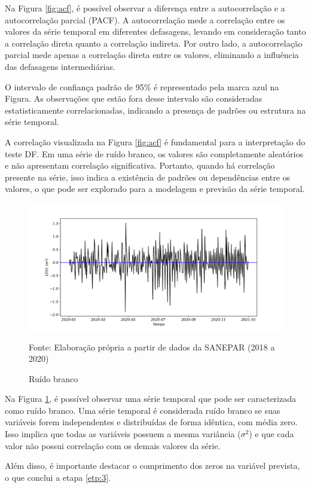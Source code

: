 Na Figura \ref{fig:acf}, é possível observar a diferença entre a autocorrelação e a autocorrelação parcial (PACF). A autocorrelação mede a correlação entre os valores da série temporal em diferentes defasagens, levando em consideração tanto a correlação direta quanto a correlação indireta. Por outro lado, a autocorrelação parcial mede apenas a correlação direta entre os valores, eliminando a influência das defasagens intermediárias.

O intervalo de confiança padrão de 95\% é representado pela marca azul na Figura. As observações que estão fora desse intervalo são consideradas estatisticamente correlacionadas, indicando a presença de padrões ou estrutura na série temporal.

A correlação visualizada na Figura \ref{fig:acf} é fundamental para a interpretação do teste DF. Em uma série de ruído branco, os valores são completamente aleatórios e não apresentam correlação significativa. Portanto, quando há correlação presente na série, isso indica a existência de padrões ou dependências entre os valores, o que pode ser explorado para a modelagem e previsão da série temporal.

\begin{figure}[H]
	\centering
	\caption{Ruído branco}
	\label{fig:ruido-branco}
	\includegraphics[width=0.9\linewidth]{Resultados/Figuras/ruido-branco}
	
	Fonte: Elaboração própria a partir de dados da SANEPAR (2018 a 2020)
\end{figure}

Na Figura \ref{fig:ruido-branco}, é possível observar uma série temporal que pode ser caracterizada como ruído branco. Uma série temporal é considerada ruído branco se suas variáveis forem independentes e distribuídas de forma idêntica, com média zero. Isso implica que todas as variáveis possuem a mesma variância ($\sigma^2$) e que cada valor não possui correlação com os demais valores da série.

Além disso, é importante destacar o comprimento dos zeros na variável prevista, o que conclui a etapa \ref{etp:3}.